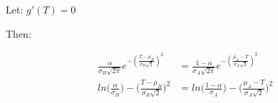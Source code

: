 \documentclass[10pt,a4paper]{article}
\begin{document}
	Let: $g'(T) = 0$
	
	Then:
	
	\begin{equation}
		\begin{split}
		\frac{\alpha}{\sigma_B\sqrt{2\pi}}e^{-(\frac{T - \mu_B}{\sigma_B\sqrt{2}})^2}
		& =  \frac{1 - \alpha}{\sigma_A\sqrt{2\pi}}e^{-(\frac{\mu_A - T}{\sigma_A\sqrt{2}})^2}\\
		ln\Big(\frac{\alpha}{\sigma_B}\Big) - \Big(\frac{T - \mu_B}{\sigma_B\sqrt{2}}\Big)^2
		& = ln\Big(\frac{1 - \alpha}{\sigma_A}\Big) - \Big(\frac{\mu_A - T}{\sigma_A\sqrt{2}}\Big)^2\\
		\end{split}
	\end{equation}
	
\end{document}
